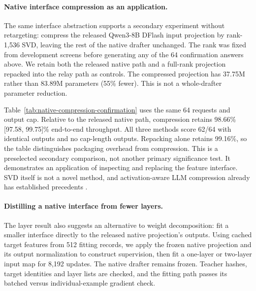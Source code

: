 \documentclass{article}
\begin{document}
\begin{table}[H]
\centering\small

\caption{Throughput retained relative to each arm's paired full mapper.
Code uses eight MBPP requests with a 512-token cap. Dialogue uses eight
two-turn MT-Bench conversations with a 256-token per-turn cap. Early,
spaced and late denote layers $[1,9]$, $[9,25]$ and $[25,33]$. All compact
maps have equal parameter count and the same fitting data and budget.}
\label{tab:crossdomain-depth}
\end{table}

\paragraph{Native interface compression as an application.}
The same interface abstraction supports a secondary experiment without
retargeting: compress the released Qwen3-8B DFlash input projection by
rank-1,536 SVD, leaving the rest of the native drafter unchanged. The
rank was fixed from development screens before generating any of the
64 confirmation answers above. We retain both the released native path
and a full-rank projection repacked into the relay path as controls.
The compressed projection has 37.75M rather than 83.89M parameters
(55\% fewer). This is not a whole-drafter parameter reduction.

Table~\ref{tab:native-compression-confirmation} uses the same 64 requests
and output cap. Relative to the released native path, compression retains
98.66\% [97.58, 99.75]\% end-to-end throughput. All three methods score
62/64 with identical outputs and no cap-length outputs. Repacking alone
retains 99.16\%, so the table distinguishes packaging overhead from
compression. This is a preselected secondary comparison, not another
primary significance test. It demonstrates an application of inspecting
and replacing the feature interface. SVD itself is not a novel method, and activation-aware
LLM compression already has established precedents
\citep{yuan2023asvd,wang2025svdllm}.

\begin{table}[H]
\centering\small

\caption{Preselected native DFlash projection compression on 64 GSM8K
requests. Retention is relative to the released native implementation.
Only projection parameters are counted.}
\label{tab:native-compression-confirmation}
\end{table}

\paragraph{Distilling a native interface from fewer layers.}
The layer result also suggests an alternative to weight decomposition:
fit a smaller interface directly to the released native projection's
outputs. Using cached target features from 512 fitting records, we apply
the frozen native projection and its output normalization to construct
supervision, then fit a one-layer or two-layer input map for 8,192 updates.
The native drafter remains frozen. Teacher hashes, target identities and
layer lists are checked, and the fitting path passes its batched versus
individual-example gradient check.
\end{document}
